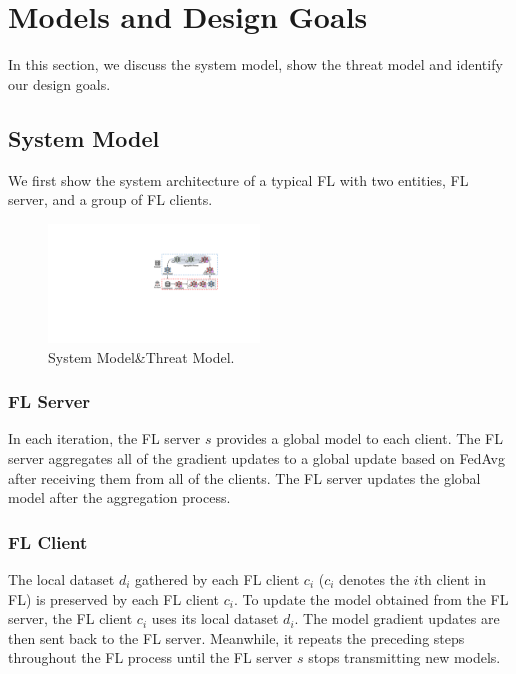 \documentclass[journal]{IEEEtran}
\begin{document}
\section{Models and Design Goals}

In this section, we discuss the system model, show the threat model and identify our design goals.

\subsection{System Model}We first show the system architecture of a typical FL with two entities, FL server, and a group of FL clients.
  \begin{figure}
    \centering
  \includegraphics[width=0.5\textwidth]{figures/Figure_System.pdf}
  \caption{System Model\&Threat Model.}
  \label{fig_system}
  \end{figure}   
\subsubsection{{FL Server}} In each iteration, the FL server $s$ provides a global model to each client. The FL server aggregates all of the gradient updates to a global update based on FedAvg after receiving them from all of the clients. The FL server updates the global model after the aggregation process.

\subsubsection{{FL Client}} The local dataset $d_i$ gathered by each FL client $c_i$ ($c_i$ denotes the $i$th client in FL) is preserved by each FL client $c_i$. To update the model obtained from the FL server, the FL client $c_i$ uses its local dataset $d_i$. The model gradient updates are then sent back to the FL server. Meanwhile, it repeats the preceding steps throughout the FL process until the FL server $s$ stops transmitting new models.
\end{document}
